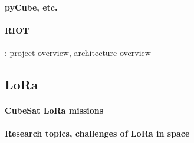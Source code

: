 \paragraph*{pyCube, etc.}
\paragraph*{RIOT}: project overview, architecture overview\cite{baccelli2018riot}


\subsection{LoRa}
\label{sec:lora-cubesat}
\paragraph*{CubeSat LoRa missions} \cite{saeed2020CubeSatReview}
\paragraph*{Research topics, challenges of LoRa in space} \cite{saeed2020CubeSatReview}

\fi
